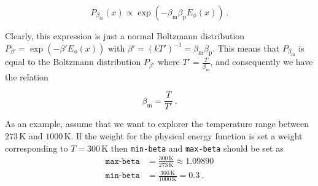 \begin{equation}
P_{\beta_{\mathrm{m}}}(x) \propto \exp (-\beta_{\mathrm{m}}\beta_{\mathrm{p}} E_{\phi}(x) )\ .
\end{equation}

\noindent Clearly, this expression is just a normal Boltzmann
distribution $P_{\beta'} = \exp(-\beta' E_{\phi}(x))$ with $\beta' =
(kT')^{-1} = \beta_{\mathrm{m}}\beta_{\mathrm{p}}$. This means that
$P_{\beta_{\mathrm{m}}}$ is equal to the Boltzmann distribution
$P_{\beta'}$ where $T' = \frac{T}{\beta_{\mathrm{m}}}$, and
consequently we have the relation

\begin{equation}
\beta_{\mathrm{m}} = \frac{T}{T'}  \ .
\end{equation}

\noindent As an example, assume that we want to explorer the
temperature range between $273\,\mathrm{K}$ and $1000\,\mathrm{K}$. If
the weight for the physical energy function is set a weight
corresponding to $T = 300\,\mathrm{K}$ then \texttt{min-beta} and
\texttt{max-beta} should be set as
\begin{align}
\texttt{max-beta} &= \frac{300\,\mathrm{K}}{273\,\mathrm{K}} \approx 1.09890 \\[1em]
\texttt{min-beta} &= \frac{300\,\mathrm{K}}{1000\,\mathrm{K}} = 0.3 \ .
\end{align}

